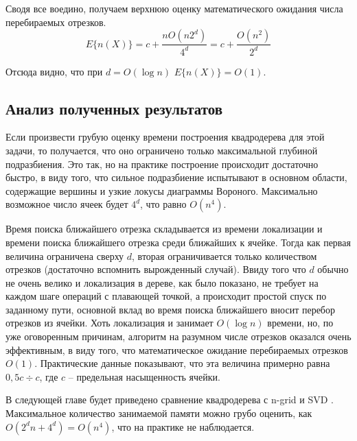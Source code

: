 Сводя все воедино, получаем верхнюю оценку математического ожидания числа перебираемых отрезков.
\begin{equation}
E\{n(X)\} = c + \frac{nO(n2^d)}{4^d} = c + \frac{O(n^2)}{2^d}
\end{equation}

Отсюда видно, что при $d = O(\log n)$ $E\{n(X)\} = O(1)$.

\FloatBarrier
\subsection{Анализ полученных результатов}
Если произвести грубую оценку времени построения квадродерева для
этой задачи, то получается, что оно ограничено только максимальной глубиной
подразбиения. Это так, но на практике построение происходит достаточно
быстро, в виду того, что сильное подразбиение испытывают в основном
области, содержащие вершины и узкие локусы диаграммы Вороного. 
Максимально возможное число ячеек будет $4^d$, что равно $O(n^4)$.

Время поиска ближайшего отрезка складывается из времени
локализации и времени поиска ближайшего отрезка среди ближайших к
ячейке. Тогда как первая величина ограничена сверху $d$, вторая ограничивается
только количеством отрезков (достаточно вспомнить вырожденный случай).
Ввиду того что $d$ обычно не очень велико и локализация в дереве, как
было показано, не требует на каждом шаге операций с плавающей точкой, 
а происходит простой спуск по заданному пути, основной вклад во время 
поиска ближайшего вносит перебор отрезков из ячейки.
Хоть локализация и занимает $O(\log n)$ времени, но, по уже оговоренным причинам,
алгоритм на разумном числе отрезков оказался очень эффективным, в виду того,
что математическое ожидание перебираемых отрезков $O(1)$. Практические данные
показывают, что эта величина примерно равна $0,5c ÷ c$, где $c$ -- предельная
насыщенность ячейки. 

В следующей главе будет приведено сравнение
квадродерева с n-grid \cite{NGRID} и SVD \cite{CGAL}.
Максимальное количество занимаемой памяти можно грубо оценить, как
$O(2^d n + 4^d) = O(n^4)$, что на практике не наблюдается.

\FloatBarrier
